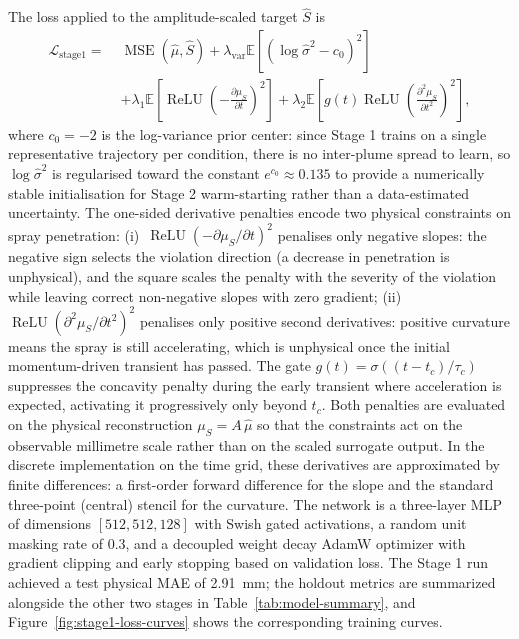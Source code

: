The loss applied to the amplitude-scaled target $\hat{S}$ is
\[
\begin{aligned}
\mathcal{L}_{\mathrm{stage1}}
=\;&\operatorname{MSE}\!\left(\hat{\mu},\hat{S}\right)
+\lambda_{\mathrm{var}}
\mathbb{E}\!\left[\left(\log \hat{\sigma}^2-c_0\right)^2\right]\\
&+\lambda_{1}
\mathbb{E}\!\left[\operatorname{ReLU}\!\left(-\frac{\partial \mu_S}{\partial t}\right)^2\right]
+\lambda_{2}
\mathbb{E}\!\left[g(t)\operatorname{ReLU}\!\left(\frac{\partial^2 \mu_S}{\partial t^2}\right)^2\right],
\end{aligned}
\]
where $c_0=-2$ is the log-variance prior center: since Stage 1 trains on a single representative trajectory per condition, there is no inter-plume spread to learn, so $\log\hat{\sigma}^2$ is regularised toward the constant $e^{c_0}\approx 0.135$ to provide a numerically stable initialisation for Stage 2 warm-starting rather than a data-estimated uncertainty. The one-sided derivative penalties encode two physical constraints on spray penetration: (i)~$\operatorname{ReLU}(-\partial\mu_S/\partial t)^2$ penalises only negative slopes: the negative sign selects the violation direction (a decrease in penetration is unphysical), and the square scales the penalty with the severity of the violation while leaving correct non-negative slopes with zero gradient; (ii)~$\operatorname{ReLU}(\partial^2\mu_S/\partial t^2)^2$ penalises only positive second derivatives: positive curvature means the spray is still accelerating, which is unphysical once the initial momentum-driven transient has passed. The gate $g(t)=\sigma((t-t_c)/\tau_c)$ suppresses the concavity penalty during the early transient where acceleration is expected, activating it progressively only beyond $t_c$. Both penalties are evaluated on the physical reconstruction $\mu_S=A\,\hat{\mu}$ so that the constraints act on the observable millimetre scale rather than on the scaled surrogate output. In the discrete implementation on the time grid, these derivatives are approximated by finite differences: a first-order forward difference for the slope and the standard three-point (central) stencil for the curvature. The network is a three-layer MLP of dimensions $[512,512,128]$ with Swish gated activations, a random unit masking rate of 0.3, and a decoupled weight decay AdamW optimizer with gradient clipping and early stopping based on validation loss. The Stage 1 run achieved a test physical MAE of \SI{2.91}{mm}; the holdout metrics are summarized alongside the other two stages in Table~\ref{tab:model-summary}, and Figure~\ref{fig:stage1-loss-curves} shows the corresponding training curves.

